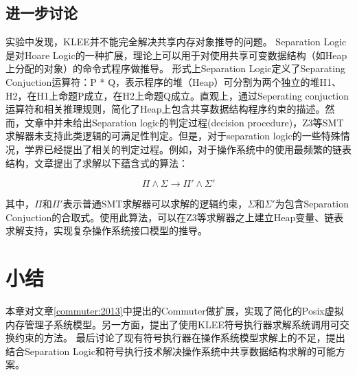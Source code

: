 \subsection{进一步讨论}

实验中发现，KLEE并不能完全解决共享内存对象推导的问题。
Separation Logic是对Hoare
Logic的一种扩展，理论上可以用于对使用共享可变数据结构（如Heap上分配的对象）的命令式程序做推导\cite{Reynolds:2002:SLL:645683.664578}。
形式上Separation Logic定义了Separating Conjuction运算符：P *
Q，表示程序的堆（Heap）可分割为两个独立的堆H1、H2，在H1上命题P成立，在H2上命题Q成立。直观上，通过Seperating
conjuction运算符和相关推理规则，简化了Heap上包含共享数据结构程序约束的描述。然而，文章\cite{Reynolds:2002:SLL:645683.664578}中并未给出Separation
logic的判定过程(decision
procedure)，Z3等SMT求解器未支持此类逻辑的可满足性判定。但是，对于separation
logic的一些特殊情况，学界已经提出了相关的判定过程。例如，对于操作系统中的使用最频繁的链表结构，文章\cite{seplogic:theorem}提出了求解以下蕴含式的算法：

\begin{equation}
	\Pi \land \Sigma \to \Pi' \land \Sigma'
\end{equation}

其中，$\Pi$和$\Pi'$表示普通SMT求解器可以求解的逻辑约束，$\Sigma$和$\Sigma'$为包含Separation
Conjuction的合取式。使用此算法，可以在Z3等求解器之上建立Heap变量、链表求解支持，实现复杂操作系统接口模型的推导。

\section{小结}
本章对文章\ref{commuter:2013}中提出的Commuter做扩展，实现了简化的Posix虚拟内存管理子系统模型。另一方面，提出了使用KLEE符号执行器求解系统调用可交换约束的方法。
最后讨论了现有符号执行器在操作系统模型求解上的不足，提出结合Separation
Logic和符号执行技术解决操作系统中共享数据结构求解的可能方案。
